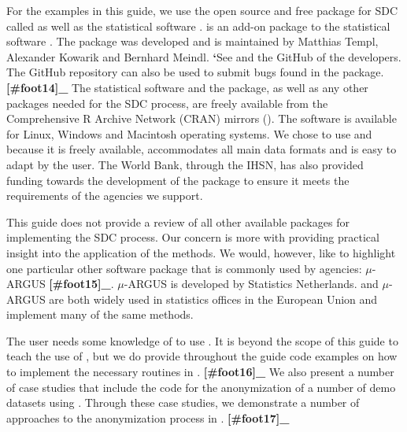 \documentclass[letterpaper,10pt,english]{sphinxmanual}
\begin{document}
For the examples in this guide, we use the open source and free package
for SDC called  as well as the statistical software .
 is an add-on package to the statistical software . The
package was developed and is maintained by Matthias Templ, Alexander
Kowarik and Bernhard Meindl. {\color{red}\bfseries{}{}`}See and the GitHub of the developers. The
GitHub repository can also be used to submit bugs found in the
package. {\color{red}\bfseries{}{[}\#foot14{]}\_} The statistical software  and the 
package, as well as any other packages needed for the SDC process, are
freely available from the Comprehensive R Archive Network (CRAN) mirrors
(). The software is available for Linux,
Windows and Macintosh operating systems. We chose to use  and
 because it is freely available, accommodates all main data
formats and is easy to adapt by the user. The World Bank, through the
IHSN, has also provided funding towards the development of the
 package to ensure it meets the requirements of the agencies
we support.

This guide does not provide a review of all other available packages for
implementing the SDC process. Our concern is more with providing
practical insight into the application of the methods. We would,
however, like to highlight one particular other software package that is
commonly used by agencies: \(\mu\)-ARGUS {\color{red}\bfseries{}{[}\#foot15{]}\_}. \(\mu\)-ARGUS is
developed by Statistics Netherlands.  and \(\mu\)-ARGUS are both
widely used in statistics offices in the European Union and implement
many of the same methods.

The user needs some knowledge of  to use . It is beyond the
scope of this guide to teach the use of , but we do provide
throughout the guide code examples on how to implement the necessary
routines in . {\color{red}\bfseries{}{[}\#foot16{]}\_} We also present a number of case
studies that include the code for the anonymization of a number of demo
datasets using . Through these case studies, we demonstrate a number
of approaches to the anonymization process in . {\color{red}\bfseries{}{[}\#foot17{]}\_}
\end{document}
